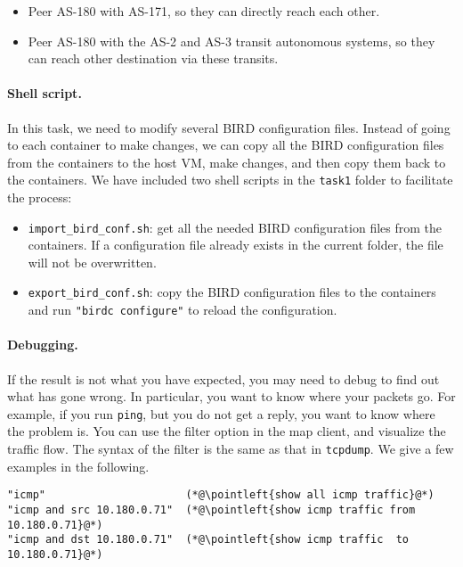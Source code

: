 \begin{itemize}[noitemsep]
  \item Peer AS-180 with AS-171, so they can directly reach each other.
  \item Peer AS-180 with the AS-2 and AS-3 transit autonomous systems, so they can
    reach other destination via these transits.
\end{itemize}

\paragraph{Shell script.}
In this task, we need to modify several BIRD configuration files.
Instead of going to each container to make changes, we can copy
all the BIRD configuration files from the containers to the host VM,
make changes, and then copy them back to the containers.
We have included two shell scripts in the \texttt{task1} folder
to facilitate the process:

\begin{itemize}[noitemsep]
  \item \texttt{import\_bird\_conf.sh}:
    get all the needed BIRD configuration files from the containers.
    If a configuration file already exists in the current folder,
    the file will not be overwritten.

  \item \texttt{export\_bird\_conf.sh}: copy the BIRD configuration
    files to the containers and run \texttt{"birdc configure"}
    to reload the configuration.
\end{itemize}


\paragraph{Debugging.}
If the result is not what you have expected, 
you may need to debug to find out what has gone wrong. In particular, 
you want to know where your packets go. For example, if you run \texttt{ping},
but you do not get a reply, you want to know where the problem is. You can
use the filter option in the map client, and visualize the traffic flow.  
The syntax of the filter is the same as that in \texttt{tcpdump}.
We give a few examples in the following.

\begin{lstlisting}
"icmp"                      (*@\pointleft{show all icmp traffic}@*) 
"icmp and src 10.180.0.71"  (*@\pointleft{show icmp traffic from 10.180.0.71}@*)
"icmp and dst 10.180.0.71"  (*@\pointleft{show icmp traffic  to 10.180.0.71}@*)
\end{lstlisting}
 

